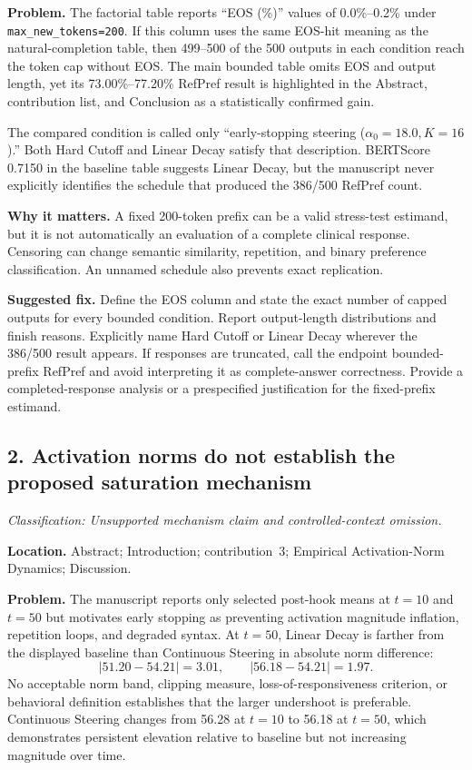 \documentclass[11pt]{article}
\newcommand{\findinglabel}[1]{\textbf{#1}}
\newcommand{\classification}[1]{\textit{Classification: #1.}}
\begin{document}
\findinglabel{Problem.} The factorial table reports ``EOS (\%)'' values of 0.0\%--0.2\% under \texttt{max\_new\_tokens=200}.  If this column uses the same EOS-hit meaning as the natural-completion table, then 499--500 of the 500 outputs in each condition reach the token cap without EOS.  The main bounded table omits EOS and output length, yet its 73.00\%--77.20\% RefPref result is highlighted in the Abstract, contribution list, and Conclusion as a statistically confirmed gain.

The compared condition is called only ``early-stopping steering ($\alpha_0=18.0,K=16$).''  Both Hard Cutoff and Linear Decay satisfy that description.  BERTScore 0.7150 in the baseline table suggests Linear Decay, but the manuscript never explicitly identifies the schedule that produced the 386/500 RefPref count.

\findinglabel{Why it matters.} A fixed 200-token prefix can be a valid stress-test estimand, but it is not automatically an evaluation of a complete clinical response.  Censoring can change semantic similarity, repetition, and binary preference classification.  An unnamed schedule also prevents exact replication.

\findinglabel{Suggested fix.} Define the EOS column and state the exact number of capped outputs for every bounded condition.  Report output-length distributions and finish reasons.  Explicitly name Hard Cutoff or Linear Decay wherever the 386/500 result appears.  If responses are truncated, call the endpoint bounded-prefix RefPref and avoid interpreting it as complete-answer correctness.  Provide a completed-response analysis or a prespecified justification for the fixed-prefix estimand.

\subsection*{2. Activation norms do not establish the proposed saturation mechanism}

\classification{Unsupported mechanism claim and controlled-context omission}

\findinglabel{Location.} Abstract; Introduction; contribution~3; Empirical Activation-Norm Dynamics; Discussion.

\findinglabel{Problem.} The manuscript reports only selected post-hook means at $t=10$ and $t=50$ but motivates early stopping as preventing activation magnitude inflation, repetition loops, and degraded syntax.  At $t=50$, Linear Decay is farther from the displayed baseline than Continuous Steering in absolute norm difference:
\[
|51.20-54.21|=3.01,
\qquad
|56.18-54.21|=1.97.
\]
No acceptable norm band, clipping measure, loss-of-responsiveness criterion, or behavioral definition establishes that the larger undershoot is preferable.  Continuous Steering changes from 56.28 at $t=10$ to 56.18 at $t=50$, which demonstrates persistent elevation relative to baseline but not increasing magnitude over time.
\end{document}
